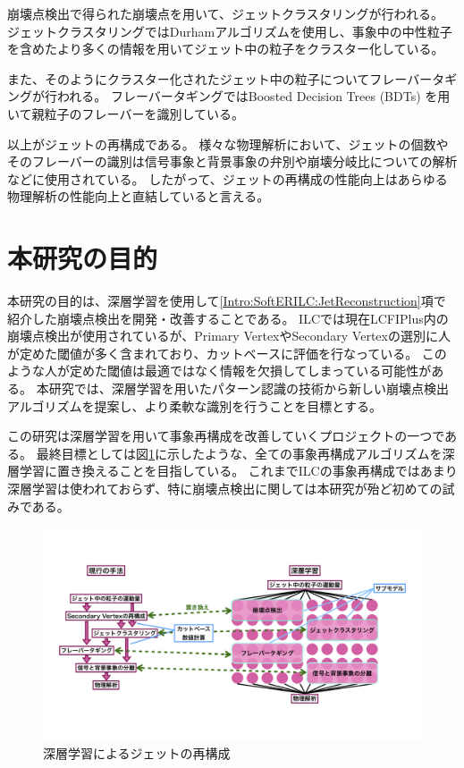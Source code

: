 崩壊点検出で得られた崩壊点を用いて、ジェットクラスタリングが行われる。
ジェットクラスタリングではDurhamアルゴリズム\cite{Durhampaper}を使用し、事象中の中性粒子を含めたより多くの情報を用いてジェット中の粒子をクラスター化している。

また、そのようにクラスター化されたジェット中の粒子についてフレーバータギングが行われる。
フレーバータギングではBoosted Decision Trees (BDTs) を用いて親粒子のフレーバーを識別している。

以上がジェットの再構成である。
様々な物理解析において、ジェットの個数やそのフレーバーの識別は信号事象と背景事象の弁別や崩壊分岐比についての解析などに使用されている。
したがって、ジェットの再構成の性能向上はあらゆる物理解析の性能向上と直結していると言える。

\section{本研究の目的} \label{Intro:Purpose}

本研究の目的は、深層学習を使用して\ref{Intro:SoftERILC:JetReconstruction}項で紹介した崩壊点検出を開発・改善することである。
ILCでは現在LCFIPlus内の崩壊点検出が使用されているが、Primary VertexやSecondary Vertexの選別に人が定めた閾値が多く含まれており、カットベースに評価を行なっている。
このような人が定めた閾値は最適ではなく情報を欠損してしまっている可能性がある。
本研究では、深層学習を用いたパターン認識の技術から新しい崩壊点検出アルゴリズムを提案し、より柔軟な識別を行うことを目標とする。

この研究は深層学習を用いて事象再構成を改善していくプロジェクトの一つである。
最終目標としては図\ref{7JetReconstructionwithDeepLearning}に示したような、全ての事象再構成アルゴリズムを深層学習に置き換えることを目指している。
これまでILCの事象再構成ではあまり深層学習は使われておらず、特に崩壊点検出に関しては本研究が殆ど初めての試みである。

\begin{figure}[htbp]
 \centering
 \includegraphics[width=1.0\textwidth]{Figure/1Introduction/7JetReconstructionwithDeepLearning.png}
 \caption{深層学習によるジェットの再構成}
 \label{7JetReconstructionwithDeepLearning}
\end{figure}

